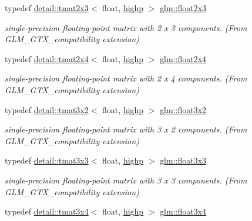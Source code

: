 \begin{DoxyCompactItemize}
typedef \hyperlink{structglm_1_1detail_1_1tmat2x3}{detail\+::tmat2x3}$<$ float, \hyperlink{namespaceglm_a0f04f086094c747d227af4425893f545ac6f7eab42eacbb10d59a58e95e362074}{highp} $>$ \hyperlink{group__gtx__compatibility_gaf6c91675c075853da392b1d2dfc45f65}{glm\+::float2x3}
\begin{DoxyCompactList}\small\item\em single-\/precision floating-\/point matrix with 2 x 3 components. (From G\+L\+M\+\_\+\+G\+T\+X\+\_\+compatibility extension) \end{DoxyCompactList}\item 
typedef \hyperlink{structglm_1_1detail_1_1tmat2x4}{detail\+::tmat2x4}$<$ float, \hyperlink{namespaceglm_a0f04f086094c747d227af4425893f545ac6f7eab42eacbb10d59a58e95e362074}{highp} $>$ \hyperlink{group__gtx__compatibility_gaaff795523eb814705d3f1cc7fd3421f2}{glm\+::float2x4}
\begin{DoxyCompactList}\small\item\em single-\/precision floating-\/point matrix with 2 x 4 components. (From G\+L\+M\+\_\+\+G\+T\+X\+\_\+compatibility extension) \end{DoxyCompactList}\item 
typedef \hyperlink{structglm_1_1detail_1_1tmat3x2}{detail\+::tmat3x2}$<$ float, \hyperlink{namespaceglm_a0f04f086094c747d227af4425893f545ac6f7eab42eacbb10d59a58e95e362074}{highp} $>$ \hyperlink{group__gtx__compatibility_ga19bcbd4d65c70cd07907b2d688bc84ed}{glm\+::float3x2}
\begin{DoxyCompactList}\small\item\em single-\/precision floating-\/point matrix with 3 x 2 components. (From G\+L\+M\+\_\+\+G\+T\+X\+\_\+compatibility extension) \end{DoxyCompactList}\item 
typedef \hyperlink{structglm_1_1detail_1_1tmat3x3}{detail\+::tmat3x3}$<$ float, \hyperlink{namespaceglm_a0f04f086094c747d227af4425893f545ac6f7eab42eacbb10d59a58e95e362074}{highp} $>$ \hyperlink{group__gtx__compatibility_ga11458ecd63c32b7e502d90091a6d0a6c}{glm\+::float3x3}
\begin{DoxyCompactList}\small\item\em single-\/precision floating-\/point matrix with 3 x 3 components. (From G\+L\+M\+\_\+\+G\+T\+X\+\_\+compatibility extension) \end{DoxyCompactList}\item 
typedef \hyperlink{structglm_1_1detail_1_1tmat3x4}{detail\+::tmat3x4}$<$ float, \hyperlink{namespaceglm_a0f04f086094c747d227af4425893f545ac6f7eab42eacbb10d59a58e95e362074}{highp} $>$ \hyperlink{group__gtx__compatibility_ga53eb75b08b92aa34886397150c983943}{glm\+::float3x4}

\end{DoxyCompactItemize}
